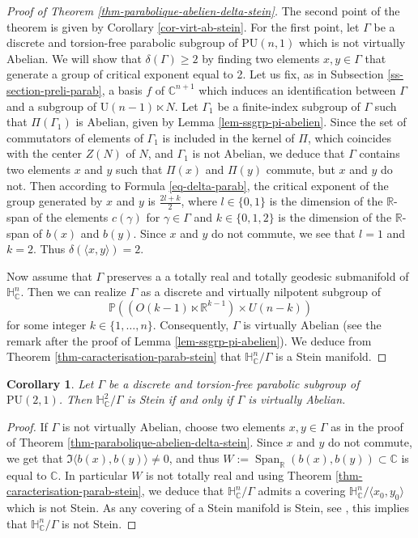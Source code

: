 \documentclass{article}
\newtheorem{corollary}[theorem]{Corollary}
\theoremstyle{definition}
\theoremstyle{remark}
\newcommand{\C}{\mathbb{C}}
\newcommand{\R}{\mathbb{R}}
\newcommand{\HNC}{\mathbb{H}^{n}_{\C}}
\newcommand{\PU}{\mathrm{PU}}
\begin{document}
	\begin{proof}[Proof of Theorem \ref{thm-parabolique-abelien-delta-stein}]
		The second point of the theorem is given by Corollary \ref{cor-virt-ab-stein}. For the first point, let $\Gamma$ be a discrete and torsion-free parabolic subgroup of $\PU(n,1)$ which is not virtually Abelian. We will show that $\delta(\Gamma)\ge2$ by finding two elements $x,y\in \Gamma$ that generate a group of critical exponent equal to 2. Let us fix, as in Subsection \ref{ss-section-preli-parab}, a basis $f$ of $\C^{n+1}$ which induces an identification between $\Gamma$ and a subgroup of $\mathrm{U}(n-1)\ltimes N$. Let $\Gamma_1$ be a finite-index subgroup of $\Gamma$ such that $\Pi(\Gamma_1)$ is Abelian, given by Lemma \ref{lem-ssgrp-pi-abelien}. Since the set of commutators of elements of $\Gamma_1$ is included in the kernel of $\Pi$, which coincides with the center $Z(N)$ of $N$, and $\Gamma_1$ is not Abelian, we deduce that $\Gamma$ contains two elements $x$ and $y$ such that $\Pi(x)$ and $\Pi(y)$ commute, but $x$ and $y$ do not. Then according to Formula \eqref{eq-delta-parab}, the critical exponent of the group generated by $x$ and $y$ is $\frac{2l+k}{2}$, where $l\in\{0,1\}$ is the dimension of the $\R$-span of the elements $c(\gamma)$ for $\gamma\in\Gamma$ and $k\in\{0,1,2\}$ is the dimension of the $\R$-span of $b(x)$ and $b(y)$. Since $x$ and $y$ do not commute, we see that $l=1$ and $k=2$. Thus $\delta(\langle x,y\rangle)=2$.
		
		Now assume that $\Gamma$ preserves a a totally real and totally geodesic submanifold of $\HNC$. Then we can realize $\Gamma$ as a discrete and virtually nilpotent subgroup of \begin{equation*}
			\mathbb{P}((O(k-1)\ltimes \R^{k-1})\times U(n-k))
		\end{equation*}for some integer $k\in\{1,\dots,n\}$. Consequently, $\Gamma$ is virtually Abelian (see the remark after the proof of Lemma \ref{lem-ssgrp-pi-abelien}). We deduce from Theorem \ref{thm-caracterisation-parab-stein} that $\HNC/\Gamma$ is a Stein manifold.
	\end{proof}
	
	\begin{corollary}\label{cor-parab-dim2}
		Let $\Gamma$ be a discrete and torsion-free parabolic subgroup of $\PU(2,1)$. Then $\mathbb{H}^{2}_{\C}/\Gamma$ is Stein if and only if $\Gamma$ is virtually Abelian.
	\end{corollary}
	
	\begin{proof}
		If $\Gamma$ is not virtually Abelian, choose two elements $x,y\in \Gamma$ as in the proof of Theorem \ref{thm-parabolique-abelien-delta-stein}. Since $x$ and $y$ do not commute, we get that $\Im\langle b(x),b(y)\rangle \ne 0$, and thus $W:=\operatorname{Span}_{\R}(b(x),b(y))\subset\C$ is equal to $\C$. In particular $W$ is not totally real and using Theorem \ref{thm-caracterisation-parab-stein}, we deduce that $\HNC/\Gamma$ admits a covering $\HNC/\langle x_0,y_0\rangle$ which is not Stein. As any covering of a Stein manifold is Stein, see \cite{steinUberlagerungenHolomorphvollstandigerKomplexer1956}, this implies that $\HNC/\Gamma$ is not Stein.
	\end{proof}
	
\end{document}
